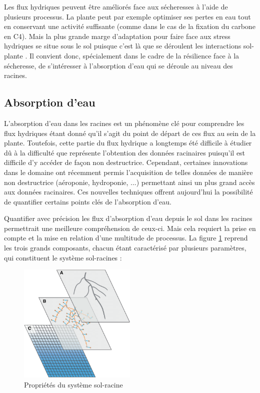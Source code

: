 Les flux hydriques peuvent être améliorés face aux sécheresses à l'aide de plusieurs processus.
La plante peut par exemple optimiser ses pertes en eau tout en conservant une activité suffisante (comme dans le cas de la fixation du carbone en C4).
Mais la plus grande marge d'adaptation pour faire face aux stress hydriques se situe sous le sol puisque c'est là que se déroulent les interactions sol-plante \citep{dunbabin_modelling_2013}. 
Il convient donc, spécialement dans le cadre de la résilience face à la sécheresse, de s'intéresser à l'absorption d'eau qui se déroule au niveau des racines. 

\subsection{Absorption d'eau}

L'absorption d'eau dans les racines est un phénomène clé pour comprendre les flux hydriques étant donné qu'il s'agit du point de départ de ces flux au sein de la plante.
Toutefois, cette partie du flux hydrique a longtemps été difficile à étudier dû à la difficulté que représente l'obtention des données racinaires puisqu'il est difficile d'y accéder de façon non destructrice.
Cependant, certaines innovations dans le domaine ont récemment permis l'acquisition de telles données de manière non destructrice (aéroponie, hydroponie, ...) permettant ainsi un plus grand accès aux données racinaires.
Ces nouvelles techniques offrent aujourd'hui la possibilité de quantifier certains points clés de l'absorption d'eau.
\newline

Quantifier avec précision les flux d'absorption d'eau depuis le sol dans les racines permettrait une meilleure compréhension de ceux-ci.
Mais cela requiert la prise en compte et la mise en relation d'une multitude de processus.
La figure \ref{fig:système sol-racine} reprend les trois grands composants, chacun étant caractérisé par plusieurs paramètres, qui constituent le système sol-racines : 

\begin{figure}[ht]
\centering
\includegraphics[width=0.5\textwidth]{Image/Properties of the soil root system.png}
\caption{Propriétés du système sol-racine \citep{lobet_plant_2014}}
\label{fig:système sol-racine}
\end{figure}

